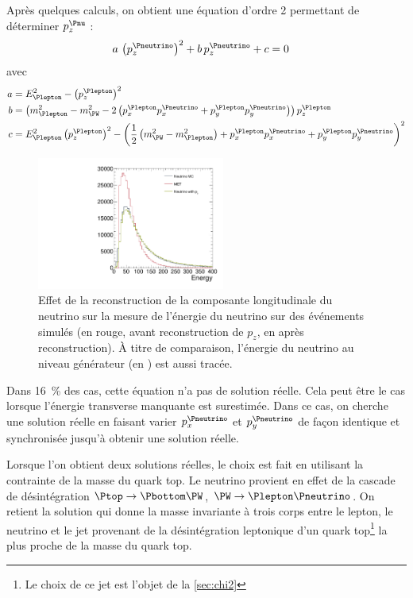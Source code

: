 Après quelques calculs, on obtient une équation d'ordre 2 permettant de déterminer $p_z^{\Pnu}$ :
\begin{align*}
  a \, \left( p_z^{{\Pneutrino}} \right)^2 + b \, p_z^{{\Pneutrino}} + c &= 0
\end{align*}
avec
\begin{align*}
  a &= E_{\Plepton}^2 - \left( p_z^{{\Plepton}} \right)^2 \\
  b &= \left( m_{\Plepton}^2 - m_{\PW}^2 - 2 \left( p_x^{\Plepton} p_x^{\Pneutrino} + p_y^{\Plepton} p_y^{\Pneutrino} \right) \right) p_z^{\Plepton} \\
  c &= E_{\Plepton}^2 \left( p_z^{\Plepton} \right)^2 - \left( \frac{1}{2} \left( m_{\PW}^2 - m_{\Plepton}^2 \right) + p_x^{\Plepton} p_x^{\Pneutrino} + p_y^{\Plepton} p_y^{\Pneutrino} \right)^2
\end{align*}

\begin{figure}[tbp]
    \centering
    \includegraphics[width=0.55\textwidth,origin=c,angle=-90]{chapitre6/figs/plot_met_energy.pdf}
    \caption{Effet de la reconstruction de la composante longitudinale du neutrino sur la mesure de l'énergie du neutrino sur des événements \ttbar simulés (en \textcolor{rouge_grandmere}{rouge}, avant reconstruction de $p_z$, en \vertc après reconstruction). À titre de comparaison, l'énergie du neutrino au niveau générateur (en \gris) est aussi tracée.}
    \label{fig:neutrino_correction}
\end{figure}

Dans \tilde\SI{16}{\%} des cas, cette équation n'a pas de solution réelle. Cela peut être le cas lorsque l'énergie transverse manquante est surestimée. Dans ce cas, on cherche une solution réelle en faisant varier $p_x^{\Pneutrino}$ et $p_y^{\Pneutrino}$ de façon identique et synchronisée jusqu'à obtenir une solution réelle.

Lorsque l'on obtient deux solutions réelles, le choix est fait en utilisant la contrainte de la masse du quark top. Le neutrino provient en effet de la cascade de désintégration $\Ptop \rightarrow \Pbottom \PW$, $\PW \rightarrow \Plepton \Pneutrino$. On retient la solution qui donne la masse invariante à trois corps entre le lepton, le neutrino et le jet \Pbottom provenant de la désintégration leptonique d'un quark top\footnote{Le choix de ce jet est l'objet de la \cref{sec:chi2}} la plus proche de la masse du quark top.

